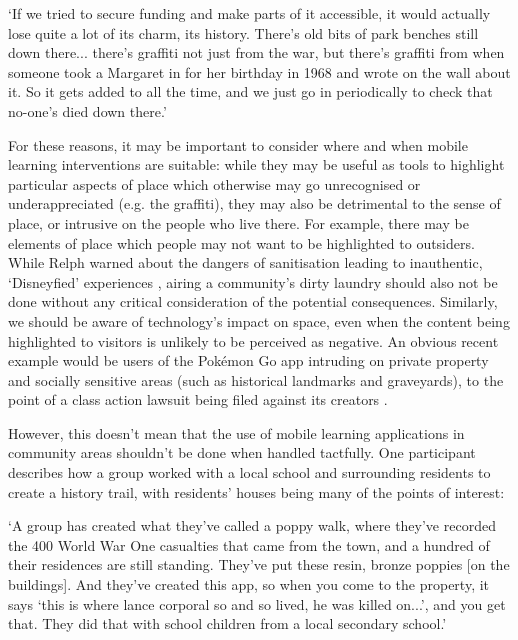 \begin{displayquote}
`If we tried to secure funding and make parts of it accessible, it would actually lose quite a lot of its charm, its history. There's old bits of park benches still down there... there's graffiti not just from the war, but there's graffiti from when someone took a Margaret in for her birthday in 1968 and wrote on the wall about it. So it gets added to all the time, and we just go in periodically to check that no-one's died down there.'
\end{displayquote}

For these reasons, it may be important to consider where and when mobile learning interventions are suitable: while they may be useful as tools to highlight particular aspects of place which otherwise may go unrecognised or underappreciated (e.g. the graffiti), they may also be detrimental to the sense of place, or intrusive on the people who live there. For example, there may be elements of place which people may not want to be highlighted to outsiders. While Relph warned about the dangers of sanitisation leading to inauthentic, `Disneyfied' experiences \citep{Relph2018}, airing a community's dirty laundry should also not be done without any critical consideration of the potential consequences. Similarly, we should be aware of technology's impact on space, even when the content being highlighted to visitors is unlikely to be perceived as negative. An obvious recent example would be users of the Pok\'emon Go app intruding on private property and socially sensitive areas (such as historical landmarks and graveyards), to the point of a class action lawsuit being filed against its creators \citep{Marder2016}.

However, this doesn't mean that the use of mobile learning applications in community areas shouldn't be done when handled tactfully. One participant describes how a group worked with a local school and surrounding residents to create a history trail, with residents' houses being many of the points of interest:

\begin{displayquote}
`A group has created what they've called a poppy walk, where they've recorded the 400 World War One casualties that came from the town, and a hundred of their residences are still standing. They've put these resin, bronze poppies [on the buildings]. And they've created this app, so when you come to the property, it says `this is where lance corporal so and so lived, he was killed on...', and you get that. They did that with school children from a local secondary school.'
\end{displayquote}

